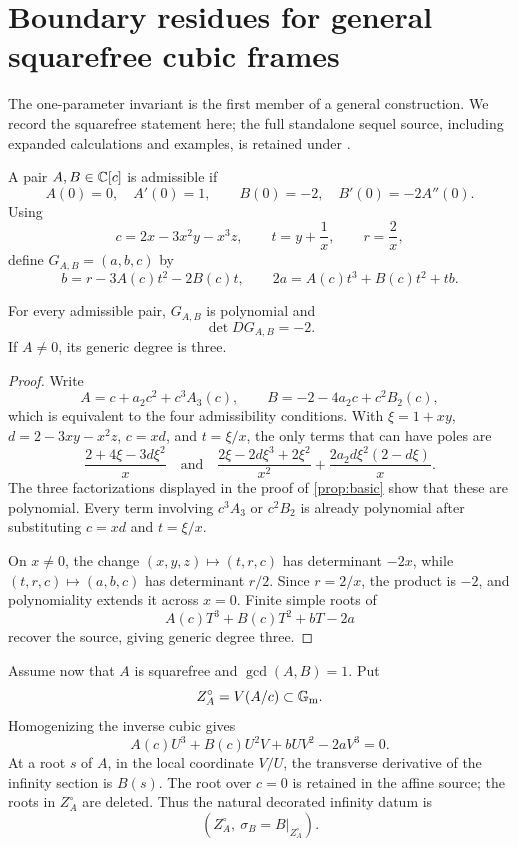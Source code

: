\section{Boundary residues for general squarefree cubic frames}
\label{app:general-boundary-residues}

The one-parameter invariant is the first member of a general construction.
We record the squarefree statement here; the full standalone sequel source,
including expanded calculations and examples, is retained under
.

\begin{definition}
A pair \(A,B\in\mathbb C[c]\) is admissible if
\[
A(0)=0,\quad A'(0)=1,\qquad
B(0)=-2,\quad B'(0)=-2A''(0).
\]
Using
\[
c=2x-3x^2y-x^3z,\qquad
t=y+\frac1x,\qquad r=\frac2x,
\]
define \(G_{A,B}=(a,b,c)\) by
\[
b=r-3A(c)t^2-2B(c)t,\qquad
2a=A(c)t^3+B(c)t^2+tb.
\]
\end{definition}

\begin{proposition}
\label{prop:general-frame}
For every admissible pair, \(G_{A,B}\) is polynomial and
\[
\det DG_{A,B}=-2.
\]
If \(A\ne0\), its generic degree is three.
\end{proposition}

\begin{proof}
Write
\[
A=c+a_2c^2+c^3A_3(c),\qquad
B=-2-4a_2c+c^2B_2(c),
\]
which is equivalent to the four admissibility conditions.  With
\(\xi=1+xy\), \(d=2-3xy-x^2z\), \(c=xd\), and \(t=\xi/x\), the only
terms that can have poles are
\[
\frac{2+4\xi-3d\xi^2}{x}
\quad\text{and}\quad
\frac{2\xi-2d\xi^3+2\xi^2}{x^2}
+\frac{2a_2d\xi^2(2-d\xi)}{x}.
\]
The three factorizations displayed in the proof of \cref{prop:basic} show
that these are polynomial.  Every term involving \(c^3A_3\) or \(c^2B_2\)
is already polynomial after substituting \(c=xd\) and \(t=\xi/x\).

On \(x\ne0\),
the change \((x,y,z)\mapsto(t,r,c)\) has determinant \(-2x\), while
\((t,r,c)\mapsto(a,b,c)\) has determinant \(r/2\).  Since \(r=2/x\),
the product is \(-2\), and polynomiality extends it across \(x=0\).
Finite simple roots of
\[
A(c)T^3+B(c)T^2+bT-2a
\]
recover the source, giving generic degree three.
\end{proof}

Assume now that \(A\) is squarefree and \(\gcd(A,B)=1\).  Put
\[
Z_A^\circ=V(A/c)\subset\mathbb G_{\mathrm m}.
\]
Homogenizing the inverse cubic gives
\[
A(c)U^3+B(c)U^2V+bUV^2-2aV^3=0.
\]
At a root \(s\) of \(A\), in the local coordinate \(V/U\), the transverse
derivative of the infinity section is \(B(s)\).  The root over \(c=0\) is
retained in the affine source; the roots in \(Z_A^\circ\) are deleted.
Thus the natural decorated infinity datum is
\[
\left(Z_A^\circ,\ \sigma_B=B|_{Z_A^\circ}\right).
\]

